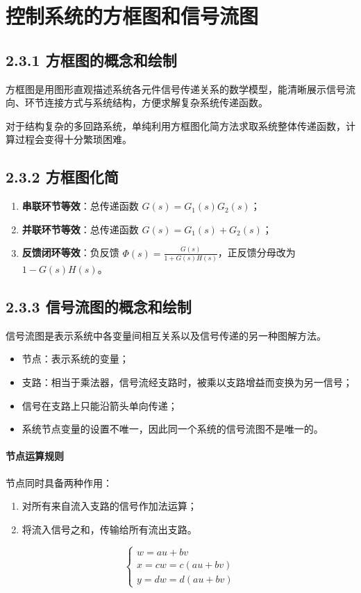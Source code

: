 \section{控制系统的方框图和信号流图}
\subsection{2.3.1 方框图的概念和绘制}
方框图是用图形直观描述系统各元件信号传递关系的数学模型，能清晰展示信号流向、环节连接方式与系统结构，方便求解复杂系统传递函数。

对于结构复杂的多回路系统，单纯利用方框图化简方法求取系统整体传递函数，计算过程会变得十分繁琐困难。

\subsection{2.3.2 方框图化简}
\begin{enumerate}
    \item \textbf{串联环节等效}：总传递函数 $G(s) = G_1(s)G_2(s)$；
    \item \textbf{并联环节等效}：总传递函数 $G(s) = G_1(s) + G_2(s)$；
    \item \textbf{反馈闭环等效}：负反馈 $\displaystyle \Phi(s) = \frac{G(s)}{1 + G(s)H(s)}$，正反馈分母改为 $1-G(s)H(s)$。
\end{enumerate}

\subsection{2.3.3 信号流图的概念和绘制}
信号流图是表示系统中各变量间相互关系以及信号传递的另一种图解方法。
\begin{itemize}
    \item 节点：表示系统的变量；
    \item 支路：相当于乘法器，信号流经支路时，被乘以支路增益而变换为另一信号；
    \item 信号在支路上只能沿箭头单向传递；
    \item 系统节点变量的设置不唯一，因此同一个系统的信号流图不是唯一的。
\end{itemize}

\paragraph{节点运算规则}
节点同时具备两种作用：
\begin{enumerate}
    \item 对所有来自流入支路的信号作加法运算；
    \item 将流入信号之和，传输给所有流出支路。
\end{enumerate}
\[
\begin{cases}
w = au+bv \\
x = cw = c(au+bv) \\
y = dw = d(au+bv)
\end{cases}
\]

